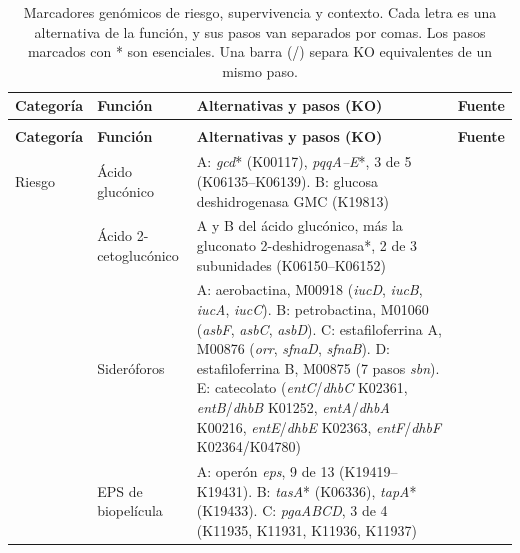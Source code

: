 \begin{nuevo}
{\footnotesize
{}
\setlength{\tabcolsep}{4pt}
\begin{xltabular}{\textwidth}{>{\raggedright\arraybackslash}p{2.3cm}>{\raggedright\arraybackslash}p{2.4cm}>{\raggedright\arraybackslash}X>{\raggedright\arraybackslash}p{2.6cm}}
\caption[Marcadores genómicos de riesgo, supervivencia y contexto]{Marcadores
genómicos de riesgo, supervivencia y contexto. Cada letra es una alternativa de
la función, y sus pasos van separados por comas. Los pasos marcados con * son
esenciales. Una barra (/) separa KO equivalentes de un mismo paso.}
\label{tab:marcadores} \\
\toprule
\textbf{Categoría} & \textbf{Función} & \textbf{Alternativas y pasos (KO)} & \textbf{Fuente} \\
\midrule
\endfirsthead
{} \\
\toprule
\textbf{Categoría} & \textbf{Función} & \textbf{Alternativas y pasos (KO)} & \textbf{Fuente} \\
\midrule
\endhead
\bottomrule
\endlastfoot
Riesgo & Ácido glucónico & A: \textit{gcd}* (K00117), \textit{pqqA--E}*, 3 de 5 (K06135--K06139). B: glucosa deshidrogenasa GMC (K19813) & \cite{uroz2026, picard2021, blanconouche2024} \\
 & Ácido 2-cetoglucónico & A y B del ácido glucónico, más la gluconato 2-deshidrogenasa*, 2 de 3 subunidades (K06150--K06152) & \cite{uroz2026, blanconouche2024} \\
 & Sideróforos & A: aerobactina, M00918 (\textit{iucD}, \textit{iucB}, \textit{iucA}, \textit{iucC}). B: petrobactina, M01060 (\textit{asbF}, \textit{asbC}, \textit{asbD}). C: estafiloferrina A, M00876 (\textit{orr}, \textit{sfnaD}, \textit{sfnaB}). D: estafiloferrina B, M00875 (7 pasos \textit{sbn}). E: catecolato (\textit{entC}/\textit{dhbC} K02361, \textit{entB}/\textit{dhbB} K01252, \textit{entA}/\textit{dhbA} K00216, \textit{entE}/\textit{dhbE} K02363, \textit{entF}/\textit{dhbF} K02364/K04780) & \cite{blanconouche2023, dalvie2026, may2001} \\
 & EPS de biopelícula & A: operón \textit{eps}, 9 de 13 (K19419--K19431). B: \textit{tasA}* (K06336), \textit{tapA}* (K19433). C: \textit{pgaABCD}, 3 de 4 (K11935, K11931, K11936, K11937) & \cite{flemming2010, arnaouteli2021} \\

\end{xltabular}}
\end{nuevo}
